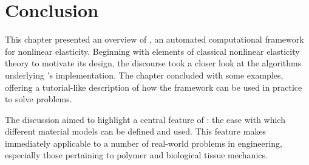 \begin{figure}
{{            } 
}
\end{figure}

\section{Conclusion}

This chapter presented an overview of \twist, an automated
computational framework for nonlinear elasticity. Beginning with
elements of classical nonlinear elasticity theory to motivate its
design, the discourse took a closer look at the algorithms underlying
\twist's implementation. The chapter concluded with some examples,
offering a tutorial-like description of how the framework can be used
in practice to solve problems.

The discussion aimed to highlight a central feature of \twist: the
ease with which different material models can be defined and
used. This feature makes \twist{} immediately applicable to a number
of real-world problems in engineering, especially those pertaining to
polymer and biological tissue mechanics.

